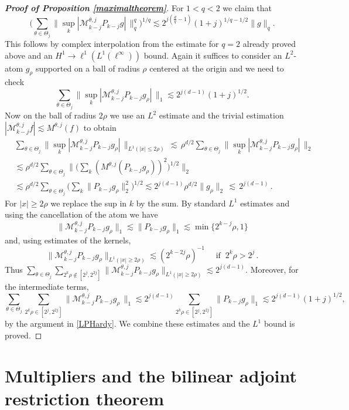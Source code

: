 \documentclass[11pt]{amsart}
\theoremstyle{definition}
\numberwithin{theorem}{section}
\numberwithin{definition}{section}
\newcommand{\note}[1]{\footnote{\texttt{\Small #1}}}
\def\lc{\lesssim}
\def\cM{{\mathcal {M}}}
\begin{document}
\begin{proof}[\bf Proof of Proposition \ref {maximaltheorem}]
For $1<q<2$ we claim that
$$\Big(\sum_{\theta\in \Theta_j} \big\|
\sup_k |\cM^{\theta,j}_{k-j}
P_{k-j} g|\, \big\|_{q}^q\Big)^{1/q} \lc 2^{j(\frac dq -1)} (1+j)^{1/q-1/2} \|g\|_q.
$$
This follows by complex  interpolation from the estimate for
$q=2$ already proved above and an
$H^1\to \ell^1(L^1(\ell^\infty))$ bound. Again it suffices to consider
 an $L^2$-atom $g_\rho$ supported on a ball  of radius $\rho$
centered at the origin and we need to check
$$\sum_{\theta\in \Theta_j} \big\|
\sup_k |\cM^{\theta,j}_{k-j}
P_{k-j} g_\rho
|\, \big\|_1 \lc 2^{j(d -1)} (1+j)^{1/2}.
$$
Now on the ball of radius $2\rho$ we use an $L^2$ estimate and the trivial estimation $|\cM^{\theta,j}_{k-j} f|
\lc M^{\theta,j}(f)$ to obtain
\begin{align*}
&\sum_{\theta\in \Theta_j} \big\|
\sup_k |\cM^{\theta,j}_{k-j}
P_{k-j} g_\rho|\, \big\|_{L^1(|x|\le 2\rho)}
\,\lc \,\rho^{d/2} \sum_{\theta\in \Theta_j} \big\|
\sup_k |\cM^{\theta,j}_{k-j}
P_{k-j} g_\rho|\, \big\|_{2}
\\
&\lc
\rho^{d/2} \sum_{\theta\in \Theta_j} \Big\|
\Big(\sum_k (M^{\theta,j}(
P_{k-j} g_\rho))^2\Big)^{1/2} \Big\|_{2}
\\
&\lc
\rho^{d/2} \sum_{\theta\in \Theta_j} \Big(\sum_k \|P_{k-j} g_\rho\|_{2}^2\Big)^{1/2}
\lc 2^{j(d-1)}
\rho^{d/2}  \|g_\rho\|_2 \,\lc \,2^{j(d-1)}\,.
\end{align*}
For $|x|\ge 2\rho$ we replace the sup in $k$ by the sum.
By standard $L^1$ estimates and using the cancellation of the atom
 we have
$$ \big\|
 \cM^{\theta,j}_{k-j}
P_{k-j} g_\rho\big\|_1 \lc
\|P_{k-j} g_\rho\big\|_1 \lc
\min \{2^{k-j}\rho, 1\}
$$
and, using estimates of  the kernels,
$$ \big\|  \cM^{\theta,j}_{k-j}
P_{k-j} g_\rho\big\|_{L^1(|x|\ge 2\rho)} \lc (2^{k-2j}\rho)^{-1}\quad \text{ if }\ 2^k\rho>2^j
\,.
$$
Thus $\sum_{\theta\in \Theta_j}\sum_{2^k\rho \notin [2^j, 2^{2j}]}
\big\|
 \cM^{\theta,j}_{k-j}
P_{k-j} g_\rho \big\|_{L^1(|x|\ge 2\rho)}
\lc 2^{j(d-1)}.$
Moreover, for the intermediate terms,
$$\sum_{\theta\in \Theta_j}\sum_{2^k\rho \in
[ 2^j, 2^{2j}] }
\big\|
 \cM^{\theta,j}_{k-j}
P_{k-j} g_\rho\, \big\|_{1}
\lc 2^{j(d-1)}\sum_{2^k\rho \in  [ 2^j, 2^{2j}]}\|P_{k-j} g_\rho\|_{1}
\lc 2^{j(d-1)}(1+j)^{1/2},$$
by the argument in \eqref{LPHardy}.
 We combine these estimates  and the $L^1$ bound is proved.
\end{proof}





\section{Multipliers and the bilinear adjoint restriction theorem}
\label{biladjrestr}
\end{document}
